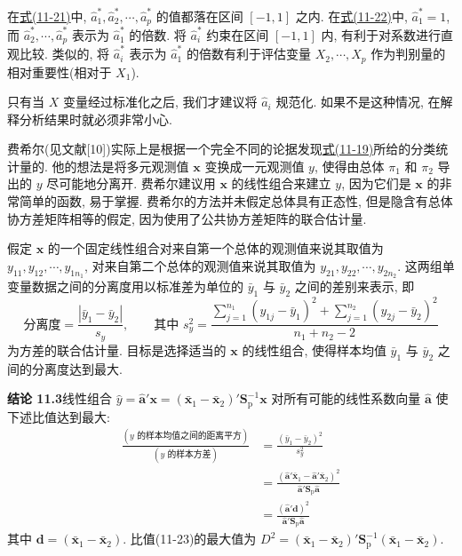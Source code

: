 
在\hyperref[eq:11-21]{式(11-21)}中, $\hat{a}_1^*, \hat{a}_2^*, \cdots, \hat{a}_p^*$ 的值都落在区间 $[-1,1]$ 之内. 在\hyperref[eq:11-22]{式(11-22)}中, $\hat{a}_1^*=1$, 而 $\hat{a}_2^*, \cdots, \hat{a}_p^*$ 表示为 $\hat{a}_1^*$ 的倍数. 将 $\hat{a}_i^*$ 约束在区间 $[-1,1]$ 内, 有利于对系数进行直观比较. 类似的, 将 $\hat{a}_i^*$ 表示为 $\hat{a}_1^*$ 的倍数有利于评估变量 $X_2,\cdots,X_p$ 作为判别量的相对重要性(相对于 $X_1$).

只有当 $X$ 变量经过标准化之后, 我们才建议将 $\hat{a}_i$ 规范化. 如果不是这种情况, 在解释分析结果时就必须非常小心.


费希尔(见文献[10])实际上是根据一个完全不同的论据发现\hyperref[eq:11-19]{式(11-19)}所给的分类统计量的. 他的想法是将多元观测值 $\mathbf{x}$ 变换成一元观测值 $y$, 使得由总体 $\pi_1$ 和 $\pi_2$ 导出的 $y$ 尽可能地分离开. 费希尔建议用 $\mathbf{x}$ 的线性组合来建立 $y$, 因为它们是 $\mathbf{x}$ 的非常简单的函数, 易于掌握. 费希尔的方法并未假定总体具有正态性, 但是隐含有总体协方差矩阵相等的假定, 因为使用了公共协方差矩阵的联合估计量.

假定 $\mathbf{x}$ 的一个固定线性组合对来自第一个总体的观测值来说其取值为 $y_{11},y_{12},\cdots,y_{1n_1}$, 对来自第二个总体的观测值来说其取值为 $y_{21},y_{22},\cdots,y_{2n_2}$. 这两组单变量数据之间的分离度用以标准差为单位的 $\bar{y}_1$ 与 $\bar{y}_2$ 之间的差别来表示, 即
\[
\text{分离度}=\frac{|\bar{y}_1-\bar{y}_2|}{s_y},\qquad \text{其中 } s_y^2=\frac{\sum_{j=1}^{n_1}(y_{1j}-\bar{y}_1)^2+\sum_{j=1}^{n_2}(y_{2j}-\bar{y}_2)^2}{n_1+n_2-2}
\]
为方差的联合估计量. 目标是选择适当的 $\mathbf{x}$ 的线性组合, 使得样本均值 $\bar{y}_1$ 与 $\bar{y}_2$ 之间的分离度达到最大.

\noindent\textbf{结论 11.3}\quad 线性组合 $\hat{y}=\hat{\mathbf{a}}'\mathbf{x}=(\bar{\mathbf{x}}_1-\bar{\mathbf{x}}_2)'\mathbf{S}_{\mathrm{p}}^{-1}\mathbf{x}$ 对所有可能的线性系数向量 $\hat{\mathbf{a}}$ 使下述比值达到最大:
\label{eq:11-23}
\begin{equation}
\begin{aligned}
\frac{(y\text{ 的样本均值之间的距离平方})}{(y\text{ 的样本方差})}&=\frac{(\bar{y}_1-\bar{y}_2)^2}{s_y^2}\\
&=\frac{(\hat{\mathbf{a}}'\bar{\mathbf{x}}_1-\hat{\mathbf{a}}'\bar{\mathbf{x}}_2)^2}{\hat{\mathbf{a}}'\mathbf{S}_{\mathrm{p}}\hat{\mathbf{a}}}\\
&=\frac{(\hat{\mathbf{a}}'\mathbf{d})^2}{\hat{\mathbf{a}}'\mathbf{S}_{\mathrm{p}}\hat{\mathbf{a}}}
\end{aligned}
\tag{11-23}
\end{equation}
其中 $\mathbf{d}=(\bar{\mathbf{x}}_1-\bar{\mathbf{x}}_2)$. 比值(11-23)的最大值为 $D^2=(\bar{\mathbf{x}}_1-\bar{\mathbf{x}}_2)'\mathbf{S}_{\mathrm{p}}^{-1}(\bar{\mathbf{x}}_1-\bar{\mathbf{x}}_2)$.

